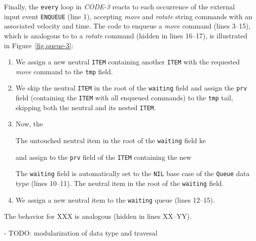 \documentclass{acm_proc_article-sp}
\newcommand{\code}[1] {{\small{\texttt{#1}}}}
\begin{document}
Finally, the \code{every} loop in \emph{CODE-3} reacts to each occurrence of 
the external input event \code{ENQUEUE} (line 1), accepting \emph{move} and 
\emph{rotate} string commands with an associated velocity and time.
The code to enqueue a \emph{move} command (lines 3--15), which is analogous to 
to a \emph{rotate} command (hidden in lines 16--17), is illustrated in 
Figure~\ref{fig.queue-3}:
%
\begin{enumerate}
\item We assign a new neutral \code{ITEM} containing another \code{ITEM} with 
the requested \emph{move} command to the \code{tmp} field.
\item We skip the neutral \code{ITEM} in the root of the \code{waiting} field 
and assign the \code{prv} field (containing the \code{ITEM} with all enqueued 
commands) to the \code{tmp} tail, skipping both the neutral and its nested 
\code{ITEM}.
\item Now, the

The untouched neutral item in the root of the \code{waiting} field ke

and assign to the \code{prv} field of the \code{ITEM} containing the new

The \code{waiting} field is automatically set to the \code{NIL} base case of 
the \code{Queue} data type (lines 10--11).
The neutral item in the root of the \code{waiting} field.
\item We assign a new neutral item to the \code{waiting} queue (lines 12--15).
\end{enumerate}
%
The behavior for XXX is analogous (hidden in lines XX--YY).

- TODO: modularization of data type and travesal
\end{document}
